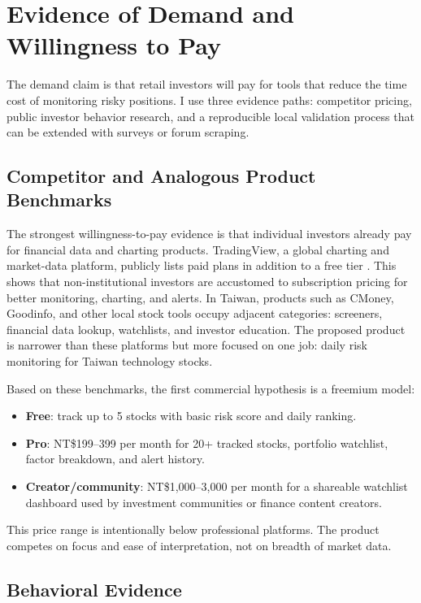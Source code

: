 \section{Evidence of Demand and Willingness to Pay}
\label{sec:demand-evidence}

The demand claim is that retail investors will pay for tools that reduce the time cost of monitoring risky positions. I use three evidence paths: competitor pricing, public investor behavior research, and a reproducible local validation process that can be extended with surveys or forum scraping.

\subsection{Competitor and Analogous Product Benchmarks}

The strongest willingness-to-pay evidence is that individual investors already pay for financial data and charting products. TradingView, a global charting and market-data platform, publicly lists paid plans in addition to a free tier \citep{tradingview_pricing}. This shows that non-institutional investors are accustomed to subscription pricing for better monitoring, charting, and alerts. In Taiwan, products such as CMoney, Goodinfo, and other local stock tools occupy adjacent categories: screeners, financial data lookup, watchlists, and investor education. The proposed product is narrower than these platforms but more focused on one job: daily risk monitoring for Taiwan technology stocks.

Based on these benchmarks, the first commercial hypothesis is a freemium model:

\begin{itemize}
    \item \textbf{Free}: track up to 5 stocks with basic risk score and daily ranking.
    \item \textbf{Pro}: NT\$199--399 per month for 20+ tracked stocks, portfolio watchlist, factor breakdown, and alert history.
    \item \textbf{Creator/community}: NT\$1,000--3,000 per month for a shareable watchlist dashboard used by investment communities or finance content creators.
\end{itemize}

This price range is intentionally below professional platforms. The product competes on focus and ease of interpretation, not on breadth of market data.

\subsection{Behavioral Evidence}

